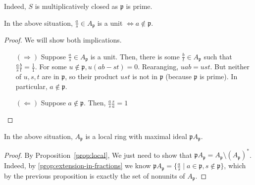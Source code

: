         \begin{rk}
            Indeed, $S$ is multiplicatively closed as $\mathfrak{p}$ is prime.
        \end{rk}

        \begin{prop}
            In the above situation, $\frac{a}{s} \in A_{\mathfrak{p}}$ is a unit $\iff a \notin \mathfrak{p}$.
        \end{prop}
            \begin{proof}
                We will show both implications.
                \begin{itemize}
                    \item[$(\Rightarrow)$] Suppose $\frac{a}{s} \in A_{\mathfrak{p}}$ is a unit.
                    Then, there is some $\frac{b}{t} \in A_{\mathfrak{p}}$ such that $\frac{a}{s} \frac{b}{t} = \frac{1}{1}$.
                    For some $u \notin \mathfrak{p}, u (ab - st) = 0$.
                    Rearanging, $uab = ust$.
                    But neither of $u, s, t$ are in $\mathfrak{p}$, so their product $ust$ is not in $\mathfrak{p}$ (because $\mathfrak{p}$ is prime).
                    In particular, $a \notin \mathfrak{p}$.
                    \item[$(\Leftarrow)$] Suppose $a \notin \mathfrak{p}$.
                    Then, $\frac{a}{s} \frac{s}{a} = 1$
                \end{itemize}
            \end{proof}

        \begin{prop}
            In the above situation, $A_{\mathfrak{p}}$ is a local ring with maximal ideal
            $\mathfrak{p}A_{\mathfrak{p}}$.
        \end{prop}
            \begin{proof}

                By Proposition~\ref{prop:local}, We just need to show that $\mathfrak{p}A_{\mathfrak{p}} = A_{\mathfrak{p}} \setminus (A_{\mathfrak{p}})^*$.
                Indeed, by \ref{prop:extension-in-fractions} we know $\mathfrak{p}A_{\mathfrak{p}} = \{\frac{a}{s} \mid a \in \mathfrak{p}, s \notin \mathfrak{p} \}$, which by the previous proposition
                is exactly the set of nonunits of $A_{\mathfrak{p}}$.

            \end{proof}

